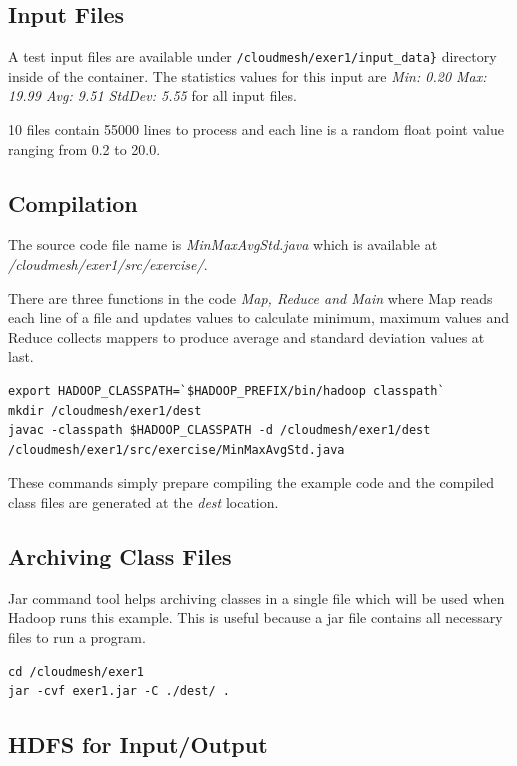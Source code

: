 \subsection{Input Files}

A test input files are available under
\verb|/cloudmesh/exer1/input_data}|
directory inside of the container. The statistics values for this
input are \textit{Min: 0.20 Max: 19.99 Avg: 9.51 StdDev: 5.55} for all
input files.

10 files contain 55000 lines to process and each line is a random
float point value ranging from 0.2 to 20.0.

\subsection{Compilation}

The source code file name is \textit{MinMaxAvgStd.java} which is
available at \textit{/cloudmesh/exer1/src/exercise/}.

There are three functions in the code \textit{Map, Reduce and Main}
where Map reads each line of a file and updates values to calculate
minimum, maximum values and Reduce collects mappers to produce average
and standard deviation values at last.

\begin{lstlisting}
export HADOOP_CLASSPATH=`$HADOOP_PREFIX/bin/hadoop classpath`
mkdir /cloudmesh/exer1/dest
javac -classpath $HADOOP_CLASSPATH -d /cloudmesh/exer1/dest /cloudmesh/exer1/src/exercise/MinMaxAvgStd.java
\end{lstlisting}

These commands simply prepare compiling the example code and the
compiled class files are generated at the \textit{dest} location.

\subsection{Archiving Class Files}

Jar command tool helps archiving classes in a single file which will be used
when Hadoop runs this example. This is useful because a jar file contains all
necessary files to run a program.

\begin{lstlisting}
cd /cloudmesh/exer1
jar -cvf exer1.jar -C ./dest/ .
\end{lstlisting}

\subsection{HDFS for Input/Output}

